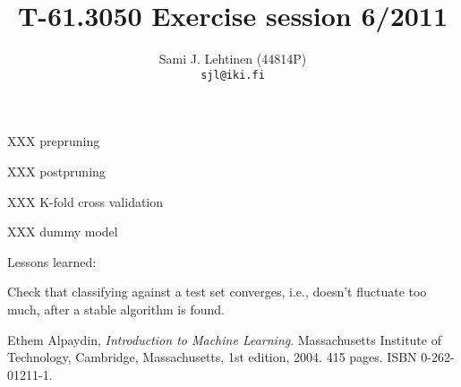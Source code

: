\documentclass[a4paper,10pt]{article}
\title{T-61.3050 Exercise session 6/2011}
\author{Sami J. Lehtinen (44814P)\\ 
       {\tt sjl@iki.fi}}
\begin{document}

\maketitle

XXX prepruning

XXX postpruning

XXX K-fold cross validation

XXX dummy model

Lessons learned:

Check that classifying against a test set converges, i.e., doesn't
fluctuate too much, after a stable algorithm is found.

\begin{thebibliography}{9}
  Ethem Alpaydin,
  \emph{Introduction to Machine Learning}.
  Massachusetts Institute of Technology, Cambridge, Massachusetts,
  1st edition,
  2004. 415 pages. ISBN 0-262-01211-1.
\end{thebibliography}
\end{document}
